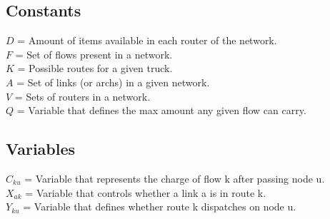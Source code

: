 \subsection{Constants}
$D$ = Amount of items available in each router of the network. \\
$F$ = Set of flows present in a network. \\
$K$ = Possible routes for a given truck. \\
$A$ = Set of links (or archs) in a given network. \\
$V$ = Sets of routers in a network. \\
$Q$ = Variable that defines the max amount any given flow can carry.

\subsection{Variables}
$C_{ku}$ =  Variable that represents the charge of flow k after passing node u. \\
$X_{ak}$ =  Variable that controls whether a link a is in route k. \\ 
$Y_{ku}$ =  Variable that defines whether route k dispatches on node u. \\

